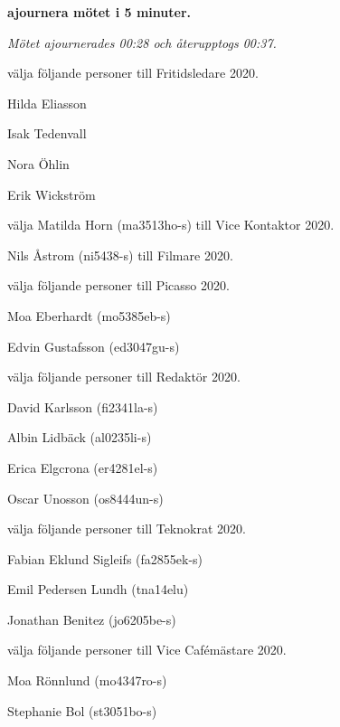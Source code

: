 \documentclass[10pt]{article}
\begin{document}
\begin{paragrafer}
\begin{paralist}
    \textbf{\Mba ajournera mötet i 5 minuter.}

    \emph{Mötet ajournerades 00:28 och återupptogs 00:37.}

    \Mba välja följande personer till Fritidsledare 2020.
    \begin{tightdashlist}
        \item Hilda Eliasson
        \item Isak Tedenvall
        \item Nora Öhlin
        \item Erik Wickström
    \end{tightdashlist}

    \Mba välja Matilda Horn (ma3513ho-s) till Vice Kontaktor 2020.

    \Mba Nils Åstrom (ni5438-s) till Filmare 2020.

    \Mba välja följande personer till Picasso 2020.
    \begin{tightdashlist}
        \item Moa Eberhardt (mo5385eb-s)
        \item Edvin Gustafsson (ed3047gu-s)
    \end{tightdashlist}

    \Mba välja följande personer till Redaktör 2020.
    \begin{tightdashlist}
        \item David Karlsson (fi2341la-s)
        \item Albin Lidbäck (al0235li-s)
        \item Erica Elgcrona (er4281el-s)
        \item Oscar Unosson (os8444un-s)
    \end{tightdashlist}

    \Mba välja följande personer till Teknokrat 2020.
    \begin{tightdashlist}
        \item Fabian Eklund Sigleifs (fa2855ek-s)
        \item Emil Pedersen Lundh (tna14elu)
        \item Jonathan Benitez (jo6205be-s)
    \end{tightdashlist}

    \Mba välja följande personer till Vice Cafémästare 2020.
    \begin{tightdashlist}
        \item Moa Rönnlund (mo4347ro-s)
        \item Stephanie Bol (st3051bo-s)
    \end{tightdashlist}


\end{paralist}
\end{paragrafer}
\end{document}
